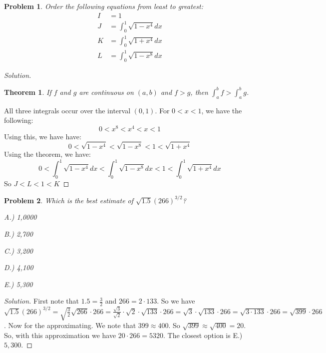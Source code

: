 \documentclass[oneside]{book}
\theoremstyle{mystyle}
\newtheorem{problem}{Problem}[section]
\newtheorem*{theorem*}{Theorem}
\begin{document}
\begin{problem}
Order the following equations from least to greatest:
\begin{align}
    \nonumber I &= 1 \\
    \nonumber J &= \int_{0}^{1}\sqrt{1-x^4}dx \\
    \nonumber K &= \int_{0}^{1}\sqrt{1+x^4}dx \\
    \nonumber L &= \int_{0}^{1}\sqrt{1-x^8}dx
\end{align}
\end{problem}
\begin{proof}[Solution]
\begin{theorem*}
If $f$ and $g$ are continuous on $(a,b)$ and $f>g$, then $\int_{a}^{b}f > \int_{a}^{b} g$.
\end{theorem*}
All three integrals occur over the interval $(0,1)$. For $0 < x < 1$, we have the following:
\begin{equation}
    \nonumber 0 < x^8 < x^4 < x < 1
\end{equation}
Using this, we have have:
\begin{equation}
    \nonumber 0 < \sqrt{1-x^4} < \sqrt{1-x^8} < 1 < \sqrt{1+x^4}
\end{equation}
Using the theorem, we have:
\begin{equation}
    \nonumber 0 < \int_{0}^{1}\sqrt{1-x^4}dx < \int_{0}^{1}\sqrt{1-x^8}dx < 1 < \int_{0}^{1}\sqrt{1+x^4}dx
\end{equation}
So $J < L < 1 < K$
\end{proof}

\begin{problem}
Which is the best estimate of $\sqrt{1.5}(266)^{3/2}$?
\begin{enumerate}
    \begin{multicols}{5}
    \item[A.)] 1,0000
    \item[B.)] 2,700
    \item[C.)] 3,200
    \item[D.)] 4,100
    \item[E.)] 5,300
    \end{multicols}
\end{enumerate}
\end{problem}
\begin{proof}[Solution]
First note that $1.5 = \frac{3}{2}$ and $266 = 2\cdot 133$. So we have $\sqrt{1.5}(266)^{3/2} = \sqrt{\frac{3}{2}}\sqrt{266}\cdot 266 = \frac{\sqrt{3}}{\sqrt{2}}\cdot \sqrt{2}\cdot \sqrt{133}\cdot 266 = \sqrt{3}\cdot \sqrt{133}\cdot 266 = \sqrt{3\cdot 133}\cdot 266 = \sqrt{399}\cdot 266$. Now for the approximating. We note that $399 \approx 400$. So $\sqrt{399} \approx \sqrt{400} = 20$. So, with this approximation we have $20\cdot 266 = 5320$. The closest option is E.) $5,300$.
\end{proof}
\end{document}
